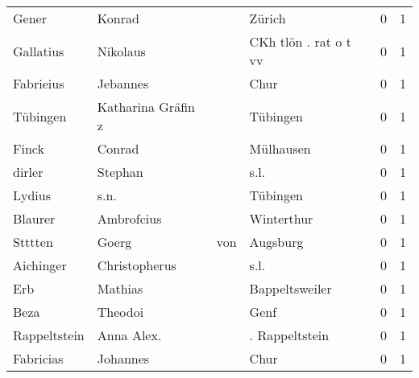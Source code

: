 \documentclass[10pt,a4paper,landscape]{article}
\begin{document}
\begin{longtable}{llllrr}
                    Gener &                             Konrad &             &                                      Zürich &          0 &         1 \\
                Gallatius &                           Nikolaus &             &                       CKh tlön . rat o t vv &          0 &         1 \\
                Fabrieius &                           Jebannes &             &                                        Chur &          0 &         1 \\
                 Tübingen &                 Katharina Gräfin z &             &                                    Tübingen &          0 &         1 \\
                    Finck &                             Conrad &             &                                   Mülhausen &          0 &         1 \\
                   dirler &                            Stephan &             &                                        s.l. &          0 &         1 \\
                   Lydius &                               s.n. &             &                                    Tübingen &          0 &         1 \\
                  Blaurer &                         Ambrofcius &             &                                  Winterthur &          0 &         1 \\
                  Stttten &                              Goerg &         von &                                    Augsburg &          0 &         1 \\
                Aichinger &                      Christopherus &             &                                        s.l. &          0 &         1 \\
                      Erb &                            Mathias &             &                              Bappeltsweiler &          0 &         1 \\
                     Beza &                            Theodoi &             &                                        Genf &          0 &         1 \\
             Rappeltstein &                         Anna Alex. &             &                              . Rappeltstein &          0 &         1 \\
                Fabricias &                           Johannes &             &                                        Chur &          0 &         1 \\

\end{longtable}
\end{document}
